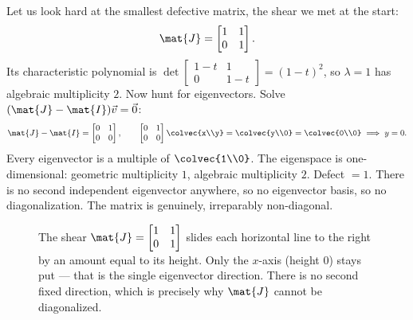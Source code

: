 Let us look hard at the smallest defective matrix, the shear we met at the start:
\[
\mat{J} = \begin{bmatrix} 1 & 1 \\ 0 & 1 \end{bmatrix}.
\]
Its characteristic polynomial is $\det\!\begin{bmatrix}1-t&1\\0&1-t\end{bmatrix}=(1-t)^2$,
so $\lambda=1$ has algebraic multiplicity $2$. Now hunt for eigenvectors. Solve
$(\mat{J}-\mat{I})\vec{v}=\vec{0}$:
\[
\mat{J}-\mat{I}=\begin{bmatrix}0&1\\0&0\end{bmatrix},\qquad
\begin{bmatrix}0&1\\0&0\end{bmatrix}\colvec{x\\y}=\colvec{y\\0}=\colvec{0\\0}
\;\Longrightarrow\; y=0.
\]
Every eigenvector is a multiple of $\colvec{1\\0}$. The eigenspace is one-dimensional:
geometric multiplicity $1$, algebraic multiplicity $2$. Defect $=1$. There is no second
independent eigenvector anywhere, so no eigenvector basis, so no diagonalization. The
matrix is genuinely, irreparably non-diagonal.

\begin{figure}[H]
\centering
{}
\caption{The shear $\mat{J}=\protect\begin{bmatrix}1&1\\0&1\protect\end{bmatrix}$ slides
each horizontal line to the right by an amount equal to its height. Only the
$x$-axis (height $0$) stays put --- that is the single eigenvector direction. There is no
second fixed direction, which is precisely why $\mat{J}$ cannot be diagonalized.}
\label{ch28:shear-grid}
\end{figure}

